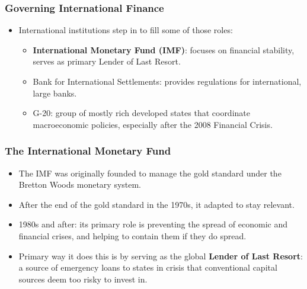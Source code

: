 \documentclass[handout]{beamer}
\begin{document}
\begin{frame} 
	\frametitle{\LARGE{Governing International Finance}}
	\begin{itemize}
		\item International institutions step in to fill some of those roles: \pause 
		\begin{itemize}
			\item \textbf{International Monetary Fund (IMF)}: focuses on financial stability, serves as primary Lender of Last Resort. \pause 
			\item Bank for International Settlements: provides regulations for international, large banks. \pause 
			\item G-20: group of mostly rich developed states that coordinate macroeconomic policies, especially after the 2008 Financial Crisis.
		\end{itemize}
	\end{itemize}
\end{frame}

\begin{frame} 
	\frametitle{\LARGE{The International Monetary Fund}}
	\begin{itemize}
		\item The IMF was originally founded to manage the gold standard under the Bretton Woods monetary system.
		\item After the end of the gold standard in the 1970s, it adapted to stay relevant.
  		\item 1980s and after: its primary role is preventing the spread of economic and financial crises, and helping to contain them if they do spread.
  		\item Primary way it does this is by serving as the global \textbf{Lender of Last Resort}: a source of emergency loans to states in crisis that conventional capital sources deem too risky to invest in. 
	\end{itemize}
\end{frame}
\end{document}
